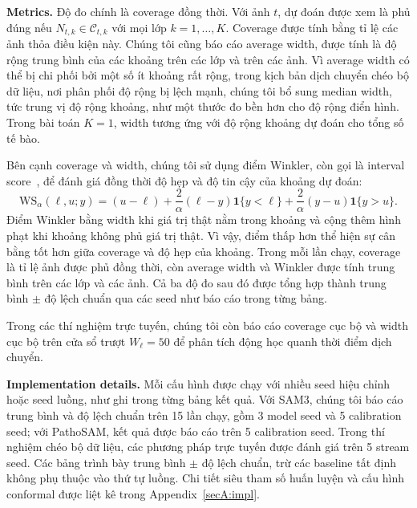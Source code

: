 \documentclass[pdflatex,sn-mathphys-num]{sn-jnl}
\begin{document}
\textbf{Metrics.}
Độ đo chính là coverage đồng thời. Với ảnh \(t\), dự đoán được xem là phủ đúng nếu
\(N_{t,k}\in \mathcal{C}_{t,k}\) với mọi lớp \(k=1,\dots,K\). Coverage được tính bằng
tỉ lệ các ảnh thỏa điều kiện này. Chúng tôi cũng báo cáo average width, được tính là
độ rộng trung bình của các khoảng trên các lớp và trên các ảnh. Vì average width có
thể bị chi phối bởi một số ít khoảng rất rộng, trong kịch bản dịch chuyển chéo bộ dữ
liệu, nơi phân phối độ rộng bị lệch mạnh, chúng tôi bổ sung median width, tức trung vị
độ rộng khoảng, như một thước đo bền hơn cho độ rộng điển hình.
Trong bài toán \(K=1\), width tương ứng với độ rộng khoảng dự đoán cho tổng số tế bào.

Bên cạnh coverage và width, chúng tôi sử dụng điểm Winkler, còn gọi là interval
score~\cite{winkler1972decision}, để đánh giá đồng thời độ hẹp và độ tin cậy của
khoảng dự đoán:
\begin{equation}
\mathrm{WS}_{\alpha}(\ell,u;y)
=
(u-\ell)
+
\frac{2}{\alpha}(\ell-y)\mathbf{1}\{y<\ell\}
+
\frac{2}{\alpha}(y-u)\mathbf{1}\{y>u\}.
\end{equation}
Điểm Winkler bằng width khi giá trị thật nằm trong khoảng và cộng thêm hình phạt khi
khoảng không phủ giá trị thật. Vì vậy, điểm thấp hơn thể hiện sự cân bằng tốt hơn giữa
coverage và độ hẹp của khoảng. Trong mỗi lần chạy, coverage là tỉ lệ ảnh được phủ đồng
thời, còn average width và Winkler được tính trung bình trên các lớp và các ảnh. Cả ba
độ đo sau đó được tổng hợp thành trung bình \(\pm\) độ lệch chuẩn qua các seed như báo
cáo trong từng bảng.

Trong các thí nghiệm trực tuyến, chúng tôi còn báo cáo coverage cục bộ và width cục
bộ trên cửa sổ trượt \(W_\ell=50\) để phân tích động học quanh thời điểm dịch chuyển.

\textbf{Implementation details.}
Mỗi cấu hình được chạy với nhiều seed hiệu chỉnh hoặc seed luồng, như ghi trong từng
bảng kết quả. Với SAM3, chúng tôi báo cáo trung bình và độ lệch chuẩn trên 15 lần chạy,
gồm 3 model seed và 5 calibration seed; với PathoSAM, kết quả được báo cáo trên 5
calibration seed. Trong thí nghiệm chéo bộ dữ liệu, các phương pháp trực tuyến được
đánh giá trên 5 stream seed. Các bảng trình bày trung bình \(\pm\) độ lệch chuẩn, trừ
các baseline tất định không phụ thuộc vào thứ tự luồng. Chi tiết siêu tham số huấn
luyện và cấu hình conformal được liệt kê trong Appendix~\ref{secA:impl}.
\end{document}
